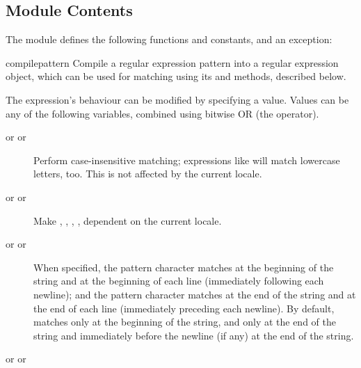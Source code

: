 \subsection{Module Contents}

The module defines the following functions and constants, and an exception:

\renewcommand{\indexsubitem}{(in module re)}

\begin{funcdesc}{compile}{pattern}
  Compile a regular expression pattern into a regular expression
  object, which can be used for matching using its  and
   methods, described below.  

  The expression's behaviour can be modified by specifying a
   value.  Values can be any of the following variables,
  combined using bitwise OR (the \code{|} operator).

\begin{description}


\item[ or  or \quad]

Perform case-insensitive matching; expressions like \code{[A-Z]} will match
lowercase letters, too.  This is not affected by the current locale.

\item[ or  or \quad]

Make , , ,
, dependent on the current locale. 

\item[ or  or \quad]

When specified, the pattern character \code{\^} matches at the
beginning of the string and at the beginning of each line
(immediately following each newline); and the pattern character
\code{\$} matches at the end of the string and at the end of each line
(immediately preceding each newline).
By default, \code{\^} matches only at the beginning of the string, and
\code{\$} only at the end of the string and immediately before the
newline (if any) at the end of the string. 

\item[ or  or \quad]


\end{description}
\end{funcdesc}
